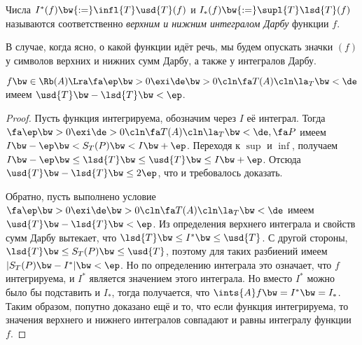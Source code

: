 \documentclass[a4paper]{article}
\begin{document}
\begin{df}
Числа $I^*(f) \bw{:=}\infl{T} \usd{T}(f)$ и $I_*(f) \bw{:=}\supl{T} \lsd{T}(f)$ называются соответственно
\emph{верхним и нижним интегралом Дарбу} функции $f$.
\end{df}

\begin{note}
В случае, когда ясно, о какой функции идёт речь, мы будем опускать значки $(f)$ у символов верхних
и нижних сумм Дарбу, а также у интегралов Дарбу.
\end{note}

\begin{theorem}
$f \bw\in \Rb(A) \Lra \fa \ep \bw> 0 \exi \de \bw> 0\cln \fa T(A)\cln \la_T \bw< \de$ имеем
$\usd{T} \bw- \lsd{T} \bw< \ep$.
\end{theorem}
\begin{proof}
Пусть функция интегрируема, обозначим через $I$ её интеграл. Тогда $\fa \ep \bw> 0 \exi \de > 0\cln
\fa T(A)\cln \la_T \bw< \de, \fa P$ имеем $I \bw- \ep \bw< S_T(P) \bw< I \bw+ \ep$. Переходя к $\sup$ и $\inf$,
получаем $I \bw- \ep \bw\le \lsd{T} \bw\le \usd{T} \bw\le I \bw+ \ep$. Отсюда
$\usd{T} \bw- \lsd{T} \bw\le 2\ep$, что и требовалось доказать.

Обратно, пусть выполнено условие $\fa \ep \bw> 0 \exi \de \bw> 0\cln \fa T(A)\cln \la_T \bw< \de$ имеем
$\usd{T} \bw- \lsd{T} \bw< \ep$. Из определения верхнего интеграла и свойств сумм Дарбу вытекает, что
$\lsd{T} \bw\le I^* \bw\le \usd{T}$. С другой стороны, $\lsd{T} \bw\le S_T(P) \bw\le \usd{T}$, поэтому для
таких разбиений имеем $|S_T(P) \bw- I^*| \bw< \ep$. Но по определению интеграла это означает, что $f$
интегрируема, и $I^*$ является значением этого интеграла. Но вместо $I^*$ можно было бы подставить
и $I_*$, тогда получается, что $\ints{A}f \bw= I^* \bw= I_*$. Таким образом, попутно доказано ещё и то,
что если функция интегрируема, то значения верхнего и нижнего интегралов совпадают и равны
интегралу функции $f$.
\end{proof}
\end{document}
